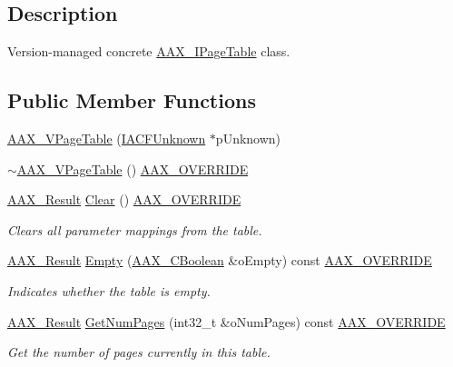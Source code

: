 \subsection{Description}
Version-\/managed concrete \mbox{\hyperlink{a01849}{A\+A\+X\+\_\+\+I\+Page\+Table}} class. \subsection*{Public Member Functions}
\begin{DoxyCompactItemize}
\item 
\mbox{\hyperlink{a01929_a8a52dc515f5a6975f34ea8dbe0f9059a}{A\+A\+X\+\_\+\+V\+Page\+Table}} (\mbox{\hyperlink{a01409}{I\+A\+C\+F\+Unknown}} $\ast$p\+Unknown)
\item 
\mbox{\hyperlink{a01929_aa525cc1f5faf35ff2c927950b89ce52b}{$\sim$\+A\+A\+X\+\_\+\+V\+Page\+Table}} () \mbox{\hyperlink{a00392_ac2f24a5172689ae684344abdcce55463}{A\+A\+X\+\_\+\+O\+V\+E\+R\+R\+I\+DE}}
\item 
\mbox{\hyperlink{a00392_a4d8f69a697df7f70c3a8e9b8ee130d2f}{A\+A\+X\+\_\+\+Result}} \mbox{\hyperlink{a01929_aacd53ddee67cffcd326c66a4f8fcd1aa}{Clear}} () \mbox{\hyperlink{a00392_ac2f24a5172689ae684344abdcce55463}{A\+A\+X\+\_\+\+O\+V\+E\+R\+R\+I\+DE}}
\begin{DoxyCompactList}\small\item\em Clears all parameter mappings from the table. \end{DoxyCompactList}\item 
\mbox{\hyperlink{a00392_a4d8f69a697df7f70c3a8e9b8ee130d2f}{A\+A\+X\+\_\+\+Result}} \mbox{\hyperlink{a01929_af6f96732f058f79df4c05cadb8e4ceef}{Empty}} (\mbox{\hyperlink{a00392_aa216506530f1d19a2965931ced2b274b}{A\+A\+X\+\_\+\+C\+Boolean}} \&o\+Empty) const \mbox{\hyperlink{a00392_ac2f24a5172689ae684344abdcce55463}{A\+A\+X\+\_\+\+O\+V\+E\+R\+R\+I\+DE}}
\begin{DoxyCompactList}\small\item\em Indicates whether the table is empty. \end{DoxyCompactList}\item 
\mbox{\hyperlink{a00392_a4d8f69a697df7f70c3a8e9b8ee130d2f}{A\+A\+X\+\_\+\+Result}} \mbox{\hyperlink{a01929_ae4f7ce9fd77ff4c7e1e079860c901200}{Get\+Num\+Pages}} (int32\+\_\+t \&o\+Num\+Pages) const \mbox{\hyperlink{a00392_ac2f24a5172689ae684344abdcce55463}{A\+A\+X\+\_\+\+O\+V\+E\+R\+R\+I\+DE}}
\begin{DoxyCompactList}\small\item\em Get the number of pages currently in this table. \end{DoxyCompactList}\item 

\end{DoxyCompactItemize}
